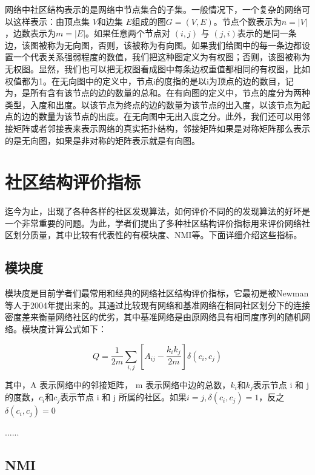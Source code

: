 网络中社区结构表示的是网络中节点集合的子集。一般情况下，一个复杂的网络可以这样表示：由顶点集 $V$和边集 $E$组成的图$G=(V,E)$。节点个数表示为$n=|V|$，边数表示为$m=|E|$。如果任意两个节点对 $(i, j)$ 与 $(j, i)$表示的是同一条边，该图被称为无向图，否则，该被称为有向图。如果我们给图中的每一条边都设置一个代表关系强弱程度的数值，我们把这种图定义为有权图；否则，该图被称为无权图。显然，我们也可以把无权图看成图中每条边权重值都相同的有权图，比如权值都为1。在无向图中的定义中，节点i的度指的是以i为顶点的边的数目，记为，是所有含有该节点的边的数量的总和。在有向图的定义中，节点的度分为两种类型，入度和出度。以该节点为终点的边的数量为该节点的出入度，以该节点为起点的边的数量为该节点的出度。在无向图中无出入度之分。此外，我们还可以用邻接矩阵或者邻接表来表示网络的真实拓扑结构，邻接矩阵如果是对称矩阵那么表示的是无向图，如果是非对称的矩阵表示就是有向图。

\section{社区结构评价指标}

迄今为止，出现了各种各样的社区发现算法，如何评价不同的的发现算法的好坏是一个非常重要的问题。为此，学者们提出了多种社区结构评价指标用来评价网络社区划分质量，其中比较有代表性的有模块度、NMI等。下面详细介绍这些指标。

\subsection{模块度}

模块度是目前学者们最常用和经典的网络社区结构评价指标，它最初是被Newman等人于2004年提出来的\cite{2002Community}。其通过比较现有网络和基准网络在相同社区划分下的连接密度差来衡量网络社区的优劣，其中基准网络是由原网络具有相同度序列的随机网络。模块度计算公式如下：

\begin{equation}
  \label{eqn:LBmodel}
  Q=\frac{1}{2m}\sum_{i,j}\left [ A_{ij}-\frac{k_ik_j}{2m} \right ]\delta (c_i, c_j)  
\end{equation}

其中，A 表示网络中的邻接矩阵， m 表示网络中边的总数，$k_i$和$k_j$表示节点 i 和 j 的度数，$c_i$和$c_j$表示节点 i 和 j 所属的社区。如果$i=j,\delta(c_i,c_j)=1$，反之$\delta(c_i,c_j)=0$

......

\subsection{NMI}

